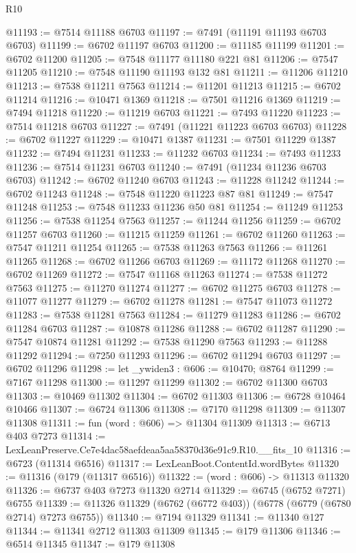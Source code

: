 \begin{lexlean}{R10}
\begin{coremodule}
@11193 := @7514 @11188 @6703
@11197 := @7491 (@11191 @11193 @6703 @6703)
@11199 := @6702 @11197 @6703
@11200 := @11185 @11199
@11201 := @6702 @11200
@11205 := @7548 @11177 @11180 @221 @81
@11206 := @7547 @11205
@11210 := @7548 @11190 @11193 @132 @81
@11211 := @11206 @11210
@11213 := @7538 @11211 @7563
@11214 := @11201 @11213
@11215 := @6702 @11214
@11216 := @10471 @1369
@11218 := @7501 @11216 @1369
@11219 := @7494 @11218
@11220 := @11219 @6703
@11221 := @7493 @11220
@11223 := @7514 @11218 @6703
@11227 := @7491 (@11221 @11223 @6703 @6703)
@11228 := @6702 @11227
@11229 := @10471 @1387
@11231 := @7501 @11229 @1387
@11232 := @7494 @11231
@11233 := @11232 @6703
@11234 := @7493 @11233
@11236 := @7514 @11231 @6703
@11240 := @7491 (@11234 @11236 @6703 @6703)
@11242 := @6702 @11240 @6703
@11243 := @11228 @11242
@11244 := @6702 @11243
@11248 := @7548 @11220 @11223 @87 @81
@11249 := @7547 @11248
@11253 := @7548 @11233 @11236 @50 @81
@11254 := @11249 @11253
@11256 := @7538 @11254 @7563
@11257 := @11244 @11256
@11259 := @6702 @11257 @6703
@11260 := @11215 @11259
@11261 := @6702 @11260
@11263 := @7547 @11211 @11254
@11265 := @7538 @11263 @7563
@11266 := @11261 @11265
@11268 := @6702 @11266 @6703
@11269 := @11172 @11268
@11270 := @6702 @11269
@11272 := @7547 @11168 @11263
@11274 := @7538 @11272 @7563
@11275 := @11270 @11274
@11277 := @6702 @11275 @6703
@11278 := @11077 @11277
@11279 := @6702 @11278
@11281 := @7547 @11073 @11272
@11283 := @7538 @11281 @7563
@11284 := @11279 @11283
@11286 := @6702 @11284 @6703
@11287 := @10878 @11286
@11288 := @6702 @11287
@11290 := @7547 @10874 @11281
@11292 := @7538 @11290 @7563
@11293 := @11288 @11292
@11294 := @7250 @11293
@11296 := @6702 @11294 @6703
@11297 := @6702 @11296
@11298 := let _ywiden3 : @606 := @10470; @8764
@11299 := @7167 @11298
@11300 := @11297 @11299
@11302 := @6702 @11300 @6703
@11303 := @10469 @11302
@11304 := @6702 @11303
@11306 := @6728 @10464 @10466
@11307 := @6724 @11306
@11308 := @7170 @11298
@11309 := @11307 @11308
@11311 := fun (word : @606) => @11304 @11309
@11313 := @6713 @403 @7273
@11314 := LexLeanPreserve.Ce7e4dac58aefdeaa5aa58370d36e91c9.R10.__fits_10
@11316 := @6723 (@11314 @6516)
@11317 := LexLeanBoot.ContentId.wordBytes
@11320 := @11316 (@179 (@11317 @6516))
@11322 := (word : @606) -> @11313 @11320
@11326 := @6737 @403 @7273 @11320 @2714
@11329 := @6745 (@6752 @7271) @6755
@11339 := @11326 @11329 (@6762 (@6772 @403)) (@6778 (@6779 (@6780 @2714) @7273 @6755))
@11340 := @7194 @11329
@11341 := @11340 @127
@11344 := @11341 @2712 @11303 @11309
@11345 := @179 @11306
@11346 := @6514 @11345
@11347 := @179 @11308

\end{coremodule}
\end{lexlean}
